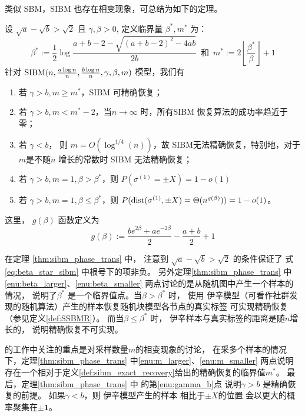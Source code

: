 类似 SBM，SIBM 也存在相变现象，可总结为如下的定理。
\begin{theorem}\label{thm:sibm_phase_trans}
  设 $\sqrt{a} - \sqrt{b} > \sqrt{2}$ 且 $\gamma, \beta > 0$,
  定义临界量 $\beta^*, m^*$ 为：
  \begin{equation}\label{eq:beta_star_sibm}
    \beta^* :=  \frac{1}{2} \log \frac{a+b-2 - \sqrt{(a+b-2)^2-4ab}}{2b}
    \, \textrm{ 和 } \,
    m^* := 2\left\lfloor\frac{\beta^*}{\beta} \right\rfloor + 1
  \end{equation}
  针对 $\operatorname{SIBM}(n, \frac{a \log n}{n}, \frac{b \log n}{n}, \gamma, \beta, m)$ 模型，我们有
  \begin{enumerate}
    \item\label{enu:m_larger} 若 $\gamma > b, m \geq m^*$，SIBM 可精确恢复；
    \item\label{enu:m_smaller} 若 $\gamma >b, m < m^*-2$，当$n\to \infty$ 时，所有SIBM 恢复算法的成功率趋近于零；
    \item\label{enu:gamma_b} 若 $ \gamma < b$， 则 $ m = O(\log^{1/4}(n))$，故 SIBM无法精确恢复，特别地，对于$m$是不随$n$
    增长的常数时 SIBM 无法精确恢复；
    \item\label{enu:beta_larger}  若 $\gamma>b, m=1, \beta > \beta^*$，则 $P(\sigma^{(1)}=\pm X) = 1-o(1)$
    \item\label{enu:beta_smaller}  若 $\gamma>b, m=1, \beta \leq \beta^*$，则
    $P(\operatorname{dist}(\sigma^{(1)}, \pm X) =
    \Theta(n^{g(\beta)}))=1-o(1)$。
  \end{enumerate}
  这里， $g(\beta)$ 函数定义为
  \begin{equation}
    g(\beta):= \frac{be^{2\beta} + a e^{-2\beta}}{2} - \frac{a+b}{2} +1
  \end{equation}
\end{theorem}
在定理 \ref{thm:sibm_phase_trans} 中，
注意到 $\sqrt{a} - \sqrt{b} > \sqrt{2}$ 的条件保证了
式\ref{eq:beta_star_sibm} 中根号下的项非负。
另外定理\ref{thm:sibm_phase_trans} 中\ref{enu:beta_larger}、\ref{enu:beta_smaller}
两点讨论的是从随机图中产生一个样本的情况，
说明了$\beta^*$ 是一个临界值点。当$\beta>\beta^*$ 时，
使用 伊辛模型（可看作社群发现的随机算法）产生的样本恢复随机块模型各节点的真实标签
可实现精确恢复（参见定义\ref{def:SSBMR}）。
而当$\beta\leq \beta^*$ 时， 伊辛样本与真实标签的距离是随$n$增长的，
说明精确恢复不可实现。

\citet{ye2020exact} 的工作中关注的重点是对采样数量$m$的相变现象的讨论，
在采多个样本的情况下，定理\ref{thm:sibm_phase_trans} 中\ref{enu:m_larger}、\ref{enu:m_smaller}
两点说明存在一个相对于定义\ref{def:sibm_exact_recovery}给出的精确恢复的临界值$m^*$。
最后，定理\ref{thm:sibm_phase_trans} 中
的第\ref{enu:gamma_b}点
说明$\gamma>b$
是精确恢复的前提。
如果$\gamma<b$，则
伊辛模型产生的样本
相比于$\pm X$的位置
会以更大的概率聚集在$\pm \bm{1}$。

